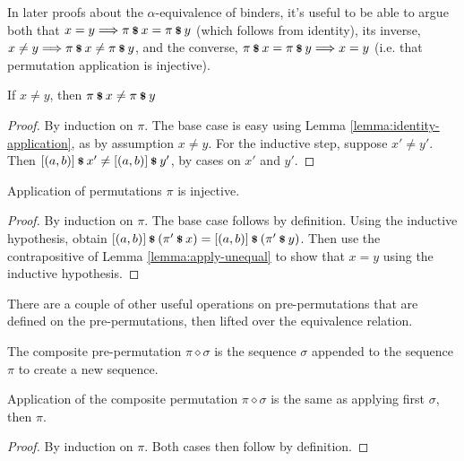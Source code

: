 In later proofs about the \(\alpha\)-equivalence of binders, it's useful to be able to argue both that \(x = y \Longrightarrow \pi \mathbin{\textrm{\footnotesize{\textbf{\$}}}} x = \pi \mathbin{\textrm{\footnotesize{\textbf{\$}}}} y\) (which follows from identity), its inverse, \(x \neq y \Longrightarrow \pi \mathbin{\textrm{\footnotesize{\textbf{\$}}}} x \neq \pi \mathbin{\textrm{\footnotesize{\textbf{\$}}}} y\), and the converse, \(\pi \mathbin{\textrm{\footnotesize{\textbf{\$}}}} x = \pi \mathbin{\textrm{\footnotesize{\textbf{\$}}}} y \Longrightarrow x = y\) (i.e. that permutation application is injective).

\begin{lemma}
\label{lemma:apply-unequal}
If \(x \neq y\), then \(\pi \mathbin{\textrm{\footnotesize{\textbf{\$}}}} x \neq \pi \mathbin{\textrm{\footnotesize{\textbf{\$}}}} y\)
\end{lemma}
\begin{proof}
By induction on \(\pi\).
The base case is easy using Lemma \ref{lemma:identity-application}, as by assumption \(x \neq y\).
For the inductive step, suppose \(x' \neq y'\).
Then \([\left(a, b\right)] \mathbin{\textrm{\footnotesize{\textbf{\$}}}} x' \neq [\left(a, b\right)] \mathbin{\textrm{\footnotesize{\textbf{\$}}}} y'\), by cases on \(x'\) and \(y'\).
\end{proof}

\begin{lemma}
Application of permutations \(\pi\) is injective.
\end{lemma}
\begin{proof}
By induction on \(\pi\).
The base case follows by definition.
Using the inductive hypothesis, obtain \([(a, b)] \mathbin{\textrm{\footnotesize{\textbf{\$}}}} \left(\pi' \mathbin{\textrm{\footnotesize{\textbf{\$}}}} x\right) = [(a, b)] \mathbin{\textrm{\footnotesize{\textbf{\$}}}} \left(\pi' \mathbin{\textrm{\footnotesize{\textbf{\$}}}} y\right)\).
Then use the contrapositive of Lemma \ref{lemma:apply-unequal} to show that \(x = y\) using the inductive hypothesis.
\end{proof}

There are a couple of other useful operations on pre-permutations that are defined on the pre-permutations, then lifted over the equivalence relation.

\begin{definition}
The composite pre-permutation \(\pi \diamond \sigma\) is the sequence \(\sigma\) appended to the sequence \(\pi\) to create a new sequence.
\end{definition}

\begin{lemma}
\label{lemma:apply-composition}
Application of the composite permutation \(\pi \diamond \sigma\) is the same as applying first \(\sigma\), then \(\pi\).
\end{lemma}
\begin{proof}
By induction on \(\pi\).
Both cases then follow by definition.
\end{proof}

